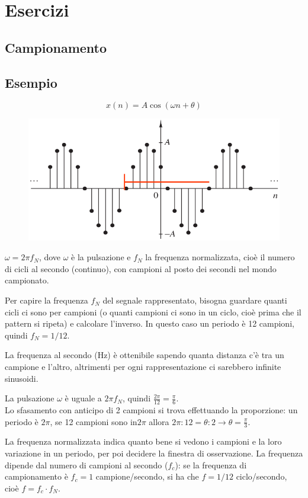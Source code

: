 \section{Esercizi}

\subsection{Campionamento}
\subsection{Esempio}
$$x(n) = A\cos(\omega n + \theta)$$
\begin{figure}[h]
	\centering
	\includegraphics[scale=0.56]{Lezioni/Immagini/esempio1}
\end{figure}

$\omega = 2\pi f_N$, dove $\omega$ è la pulsazione e $f_N$ la frequenza normalizzata, cioè il numero di cicli al secondo (continuo), con campioni al posto dei secondi nel mondo campionato.

Per capire la frequenza $f_N$ del segnale rappresentato, bisogna guardare quanti cicli ci sono per campioni (o quanti campioni ci sono in un ciclo, cioè prima che il pattern si ripeta) e calcolare l'inverso. In questo caso un periodo è 12 campioni, quindi $f_N = 1/12$.

La frequenza al secondo (Hz) è ottenibile sapendo quanta distanza c'è tra un campione e l'altro, altrimenti per ogni rappresentazione ci sarebbero infinite sinusoidi.

La pulsazione $\omega$ è uguale a $2\pi f_N$, quindi $\frac{2\pi}{12} = \frac{\pi}{6}$. \\
Lo sfasamento con anticipo di 2 campioni si trova effettuando la proporzione: un periodo è $2\pi$, se 12 campioni sono in$2\pi$ allora $2\pi : 12 = \theta : 2 \rightarrow \theta = \frac{\pi}{3}$.

La frequenza normalizzata indica quanto bene si vedono i campioni e la loro variazione in un periodo, per poi decidere la finestra di osservazione. La frequenza dipende dal numero di campioni al secondo ($f_c$): se la frequenza di campionamento è $f_c = 1$ campione/secondo, si ha che $f = 1/12$ ciclo/secondo, cioè $f = f_c \cdot f_N$.

